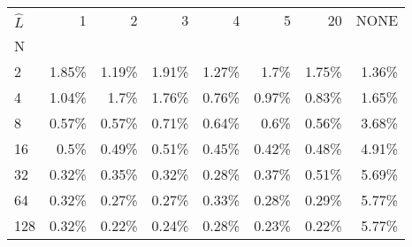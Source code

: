 \begin{tabular}{lrrrrrrr}
$\hat{L}$ & 1 & 2 & 3 & 4 & 5 & 20 & NONE\\
N &  &  &  &  &  & \\
\toprule
2 & 1.85\% & 1.19\% & 1.91\% & 1.27\% & 1.7\% & 1.75\% & 1.36\%\\
\midrule
4 & 1.04\% & 1.7\% & 1.76\% & 0.76\% & 0.97\% & 0.83\% &  1.65\%\\
\midrule
8 & 0.57\% & 0.57\% & 0.71\% & 0.64\% & 0.6\% & 0.56\%  &  3.68\%\\
\midrule
16 & 0.5\% & 0.49\% & 0.51\% & 0.45\% & 0.42\% & 0.48\%  &  4.91\%\\
\midrule
32 & 0.32\% & 0.35\% & 0.32\% & 0.28\% & 0.37\% & 0.51\%  &  5.69\% \\
\midrule
64 & 0.32\% & 0.27\% & 0.27\% & 0.33\% & 0.28\% & 0.29\% &  5.77\%\\
\midrule
128 & 0.32\% & 0.22\% & 0.24\% & 0.28\% & 0.23\% & 0.22\% & 5.77\% \\
\bottomrule
\end{tabular}